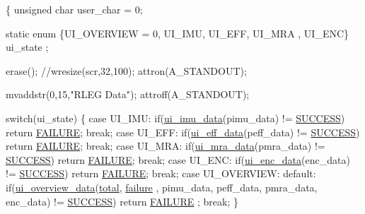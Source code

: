 \begin{DoxyCode}
\{
        \textcolor{keywordtype}{unsigned} \textcolor{keywordtype}{char} user\_char = 0;

        \textcolor{keyword}{static} \textcolor{keyword}{enum} \{UI\_OVERVIEW = 0, UI\_IMU, UI\_EFF, UI\_MRA , UI\_ENC\} ui\_state
      ;

        erase();
        \textcolor{comment}{//wresize(scr,32,100);}
        attron(A\_STANDOUT);

        mvaddstr(0,15,\textcolor{stringliteral}{"RLEG Data"});
        attroff(A\_STANDOUT);

        \textcolor{keywordflow}{switch}(ui\_state)
        \{
                \textcolor{keywordflow}{case} UI\_IMU:
                        \textcolor{keywordflow}{if}(\hyperlink{group__ui_ga7d5a9d9a75693709de408781d001a6a6}{ui\_imu\_data}(pimu\_data) != \hyperlink{calibration_2calibration_8h_aa90cac659d18e8ef6294c7ae337f6b58}{SUCCESS})
       \textcolor{keywordflow}{return} \hyperlink{calibration_2calibration_8h_a6d58f9ac447476b4e084d7ca383f5183}{FAILURE};
                        \textcolor{keywordflow}{break};
                \textcolor{keywordflow}{case} UI\_EFF:
                        \textcolor{keywordflow}{if}(\hyperlink{ui_8c_af48496a4ce54378764bc4ca9eddfd498}{ui\_eff\_data}(peff\_data) != \hyperlink{calibration_2calibration_8h_aa90cac659d18e8ef6294c7ae337f6b58}{SUCCESS})
       \textcolor{keywordflow}{return} \hyperlink{calibration_2calibration_8h_a6d58f9ac447476b4e084d7ca383f5183}{FAILURE};
                        \textcolor{keywordflow}{break};
                \textcolor{keywordflow}{case} UI\_MRA:
                        \textcolor{keywordflow}{if}(\hyperlink{group__ui_gaefec243c5df45db0350c1abbccf20e3b}{ui\_mra\_data}(pmra\_data) != \hyperlink{calibration_2calibration_8h_aa90cac659d18e8ef6294c7ae337f6b58}{SUCCESS})
       \textcolor{keywordflow}{return} \hyperlink{calibration_2calibration_8h_a6d58f9ac447476b4e084d7ca383f5183}{FAILURE};
                        \textcolor{keywordflow}{break};
        \textcolor{keywordflow}{case} UI\_ENC:
                        \textcolor{keywordflow}{if}(\hyperlink{ui_8c_a3821f6ba38465f8d170f7b947869e7d9}{ui\_enc\_data}(enc\_data) != \hyperlink{calibration_2calibration_8h_aa90cac659d18e8ef6294c7ae337f6b58}{SUCCESS}) \textcolor{keywordflow}{
      return} \hyperlink{calibration_2calibration_8h_a6d58f9ac447476b4e084d7ca383f5183}{FAILURE};
                        \textcolor{keywordflow}{break};
                \textcolor{keywordflow}{case} UI\_OVERVIEW:
                \textcolor{keywordflow}{default}:
                        \textcolor{keywordflow}{if}(\hyperlink{ui_8c_a8d5e19833fec51919aad6e78bb74619a}{ui\_overview\_data}(\hyperlink{main_8c_ac7af894858cf396a219d632f40afdc8d}{total}, \hyperlink{main_8c_a4f35e5ea2395561d0bd3b2f45612dc2c}{failure}
      , pimu\_data, peff\_data, pmra\_data, enc\_data) != \hyperlink{calibration_2calibration_8h_aa90cac659d18e8ef6294c7ae337f6b58}{SUCCESS}) \textcolor{keywordflow}{return} \hyperlink{calibration_2calibration_8h_a6d58f9ac447476b4e084d7ca383f5183}{FAILURE}
      ;
                        \textcolor{keywordflow}{break};
        \}


\end{DoxyCode}
